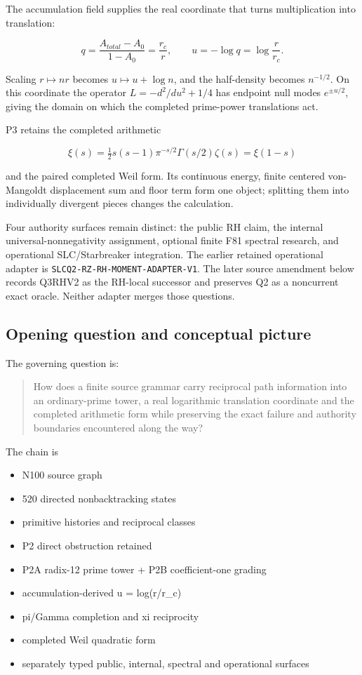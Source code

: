 The accumulation field supplies the real coordinate that turns
multiplication into translation:

\[
q=\frac{A_{total}-A_0}{1-A_0}=\frac{r_c}{r},
\qquad
u=-\log q=\log\frac r{r_c}.
\]

Scaling \(r\mapsto nr\) becomes \(u\mapsto u+\log n\), and the
half-density becomes \(n^{-1/2}\). On this coordinate the operator
\(L=-d^2/du^2+1/4\) has endpoint null modes \(e^{\pm u/2}\), giving the
domain on which the completed prime-power translations act.

P3 retains the completed arithmetic

\[
\xi(s)=\tfrac12s(s-1)\pi^{-s/2}\Gamma(s/2)\zeta(s)=\xi(1-s)
\]

and the paired completed Weil form. Its continuous energy, finite
centered von-Mangoldt displacement sum and floor term form one object;
splitting them into individually divergent pieces changes the
calculation.

Four authority surfaces remain distinct: the public RH claim, the
internal universal-nonnegativity assignment, optional finite F81
spectral research, and operational SLC/Starbreaker integration. The
earlier retained operational adapter is
\nolinkurl{SLCQ2-RZ-RH-MOMENT-ADAPTER-V1}. The later source amendment below
records Q3RHV2 as the RH-local successor and preserves Q2 as a
noncurrent exact oracle. Neither adapter merges those questions.

\subsection{Opening question and conceptual
picture}\label{viii-ch09-opening-question-and-conceptual-picture}

The governing question is:

\begin{quote}
How does a finite source grammar carry reciprocal path information into
an ordinary-prime tower, a real logarithmic translation coordinate and
the completed arithmetic form while preserving the exact failure and
authority boundaries encountered along the way?
\end{quote}

The chain is

\begin{itemize}
\tightlist
\item
  N100 source graph
\item
  520 directed nonbacktracking states
\item
  primitive histories and reciprocal classes
\item
  P2 direct obstruction retained
\item
  P2A radix-12 prime tower + P2B coefficient-one grading
\item
  accumulation-derived u = log(r/r\_c)
\item
  pi/Gamma completion and xi reciprocity
\item
  completed Weil quadratic form
\item
  separately typed public, internal, spectral and operational surfaces
\end{itemize}

